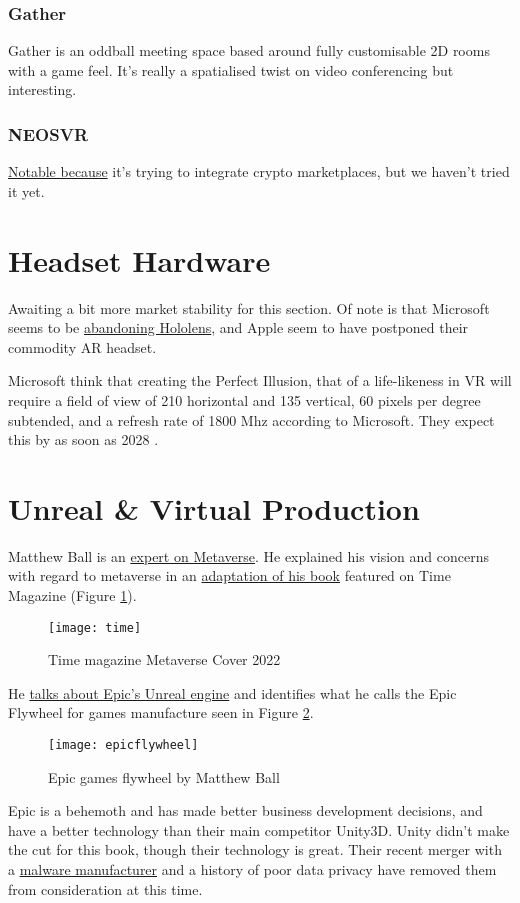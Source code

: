 \subsubsection{Gather}
Gather is an oddball meeting space based around fully customisable 2D rooms with a game feel. It's really a spatialised twist on video conferencing but interesting.  
\subsubsection{NEOSVR}
\href{https://neos.com/}{Notable because} it's trying to integrate crypto marketplaces, but we haven't tried it yet.
\section{Headset Hardware}
Awaiting a bit more market stability for this section. Of note is that Microsoft seems to be \href{https://www.windowscentral.com/microsoft/microsoft-has-laid-off-entire-teams-behind-virtual-mixed-reality-and-hololens}{abandoning Hololens}, and Apple seem to have postponed their commodity AR headset. \par
Microsoft think that creating the Perfect Illusion, that of a life-likeness in VR will require a field of view of 210 horizontal and  135 vertical, 60 pixels per degree subtended, and a refresh rate of 1800 Mhz according to Microsoft. They expect this by as soon as 2028 \cite{cuervo2018creating}.
\section{Unreal \& Virtual Production}
Matthew Ball is an \href{https://www.matthewball.vc/}{expert on Metaverse}. He explained his vision and concerns with regard to metaverse in an \href{https://time.com/6197849/metaverse-future-matthew-ball/}{adaptation of his book}\cite{ball2020metaverse} featured on Time Magazine (Figure \ref{fig:time}).\par
\begin{figure}
  \centering
    \texttt{[image: time]}
  \caption{Time magazine Metaverse Cover 2022}
  \label{fig:time}
\end{figure}
He \href{https://www.matthewball.vc/all/epicprimer1}{talks about Epic's Unreal engine} and identifies what he calls the Epic Flywheel for games manufacture seen in Figure \ref{fig:epicflywheel}.\par
\begin{figure}
  \centering
    \texttt{[image: epicflywheel]}
  \caption{Epic games flywheel by Matthew Ball}
  \label{fig:epicflywheel}
\end{figure}
Epic is a behemoth and has made better business development decisions, and have a better technology than their main competitor Unity3D. Unity didn't make the cut for this book, though their technology is great. Their recent merger with a \href{https://www.pcgamer.com/unity-is-merging-with-a-company-who-made-a-malware-installer/}{malware manufacturer} and a history of poor data privacy have removed them from consideration at this time.
